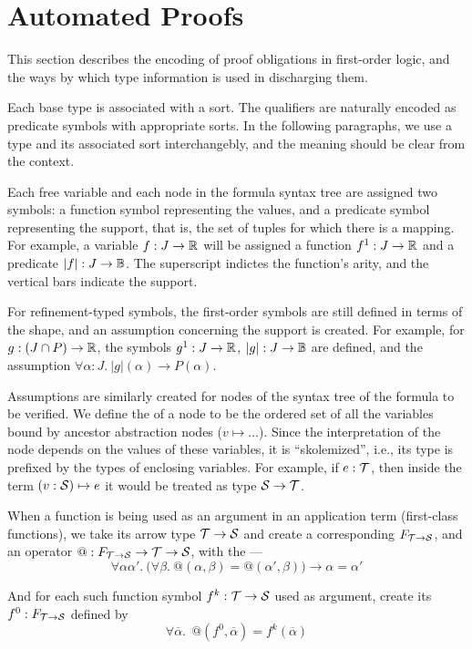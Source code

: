 \section{Automated Proofs}

\newcommand\limplies{\rightarrow}

This section describes the encoding of proof obligations in first-order logic,
and the ways by which type information is used in discharging them.

Each base type is associated with a sort. The qualifiers are naturally encoded
as predicate symbols with appropriate sorts. In the following paragraphs, we
use a type and its associated sort interchangebly, and the meaning should be clear
from the context.

Each free variable and each node in the formula syntax tree are assigned two
symbols: a function symbol representing the values, and a predicate symbol
representing the support, that is, the set of tuples for which there is a mapping.
For example, a variable $f : J\to\R$ will be assigned a function $f^1: J\to\R$
and a predicate $|f|: J\to\B$. The superscript indictes the function's arity,
and the vertical bars indicate the support.

For refinement-typed symbols, the first-order symbols are still defined in terms
of the shape, and an assumption concerning the support is created. For example,
for $g: (J\cap P)\to\R$, the symbols $g^1:J\to\R$, $|g|:J\to\B$ are defined,
and the assumption $\forall \alpha:J.~|g|(\alpha)\limplies P(\alpha)$.

Assumptions are similarly created for nodes of the syntax tree of the formula to
be verified. We define the  of a node to be the ordered set of
all the variables bound by ancestor abstraction nodes ($v\mapsto\ldots$). Since
the interpretation of the node depends on the values of these variables, it is
``skolemized'', i.e., its type is prefixed by the types of enclosing variables.
For example, if $e:\T$, then inside the term $(v:\S)\mapsto e$ it would be treated as
type $\S\to\T$.

When a function is being used as an argument in an application term (first-class functions), 
we take its arrow type $\T\to\S$ and create a corresponding  $F_{\T\to\S}$,
and an operator $@ : F_{\T\to\S}\to\T\to\S$, with the  ---
\begin{equation}
\forall \alpha\alpha'.~ \big(\forall\beta.~ @(\alpha,\beta)=@(\alpha',\beta)\big)\limplies \alpha=\alpha'
\label{automated:extensionality}
\end{equation}

And for each such function symbol $f^k:\T\to\S$ used as argument, create its 
 $f^0:F_{\T\to\S}$ defined by
\begin{equation}
\forall \overline\alpha.~~@(f^0,\overline\alpha)=f^k(\overline\alpha)
\label{automated:reflection}
\end{equation}
